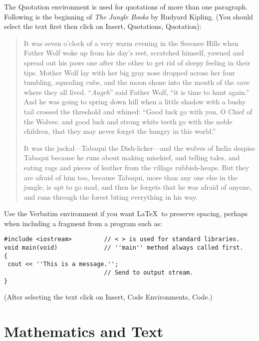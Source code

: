 \documentclass{report}%
\begin{document}
The Quotation environment is used for quotations of more than one
paragraph. Following is the beginning of \emph{The Jungle Books}
by Rudyard Kipling. (You should select the text first then click
on Insert, Quotations, Quotation):

\begin{quotation}
It was seven o'clock of a very warm evening in the Seeonee Hills
when Father Wolf woke up from his day's rest, scratched himself,
yawned  and spread out his paws one after the other to get rid of
sleepy feeling in their tips. Mother Wolf lay with her big gray
nose dropped across her four tumbling, squealing cubs, and the
moon shone into the mouth of the cave where they all lived.
``\emph{Augrh}'' said Father Wolf, ``it is time to hunt again.''
And he was going to spring down hill when a little shadow with a
bushy tail crossed the threshold and whined: ``Good luck go with
you, O Chief of the Wolves; and good luck and strong white teeth
go with the noble children, that they may never forget the hungry
in this world.''

It was the jackal---Tabaqui the Dish-licker---and the wolves of
India despise Tabaqui because he runs about making mischief, and
telling tales, and eating rags and pieces of leather from the
village rubbish-heaps. But they are afraid of him too, because
Tabaqui, more than any one else in the jungle, is apt to go mad,
and then he forgets that he was afraid of anyone, and runs through
the forest biting everything in his way.
\end{quotation}

Use the Verbatim environment if you want \LaTeX\ to preserve
spacing, perhaps when including a fragment from a program such as:
\begin{verbatim}
#include <iostream>         // < > is used for standard libraries.
void main(void)             // ''main'' method always called first.
{
 cout << ''This is a message.'';
                            // Send to output stream.
}
\end{verbatim}
(After selecting the text click on Insert, Code Environments,
Code.)

\section{Mathematics and Text}
\end{document}
